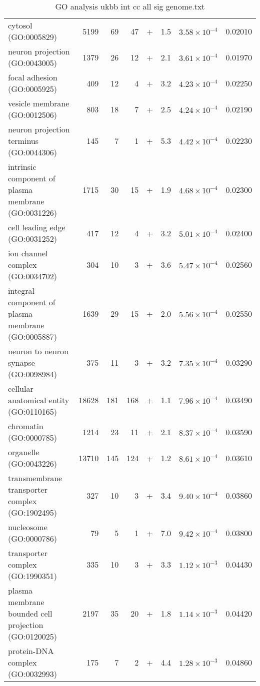\begin{table}[ht]
\begin{adjustbox}{width=\textwidth}
\begin{tabular}{lrrrlrrr}
  cytosol (GO:0005829) & 5199 & 69 & 47 & + & 1.5 & $3.58 \times 10^{-4}$ & 0.02010 \\ 
  neuron projection (GO:0043005) & 1379 & 26 & 12 & + & 2.1 & $3.61 \times 10^{-4}$ & 0.01970 \\ 
  focal adhesion (GO:0005925) & 409 & 12 & 4 & + & 3.2 & $4.23 \times 10^{-4}$ & 0.02250 \\ 
  vesicle membrane (GO:0012506) & 803 & 18 & 7 & + & 2.5 & $4.24 \times 10^{-4}$ & 0.02190 \\ 
  neuron projection terminus (GO:0044306) & 145 & 7 & 1 & + & 5.3 & $4.42 \times 10^{-4}$ & 0.02230 \\ 
  intrinsic component of plasma membrane (GO:0031226) & 1715 & 30 & 15 & + & 1.9 & $4.68 \times 10^{-4}$ & 0.02300 \\ 
  cell leading edge (GO:0031252) & 417 & 12 & 4 & + & 3.2 & $5.01 \times 10^{-4}$ & 0.02400 \\ 
  ion channel complex (GO:0034702) & 304 & 10 & 3 & + & 3.6 & $5.47 \times 10^{-4}$ & 0.02560 \\ 
  integral component of plasma membrane (GO:0005887) & 1639 & 29 & 15 & + & 2.0 & $5.56 \times 10^{-4}$ & 0.02550 \\ 
  neuron to neuron synapse (GO:0098984) & 375 & 11 & 3 & + & 3.2 & $7.35 \times 10^{-4}$ & 0.03290 \\ 
  cellular anatomical entity (GO:0110165) & 18628 & 181 & 168 & + & 1.1 & $7.96 \times 10^{-4}$ & 0.03490 \\ 
  chromatin (GO:0000785) & 1214 & 23 & 11 & + & 2.1 & $8.37 \times 10^{-4}$ & 0.03590 \\ 
  organelle (GO:0043226) & 13710 & 145 & 124 & + & 1.2 & $8.61 \times 10^{-4}$ & 0.03610 \\ 
  transmembrane transporter complex (GO:1902495) & 327 & 10 & 3 & + & 3.4 & $9.40 \times 10^{-4}$ & 0.03860 \\ 
  nucleosome (GO:0000786) & 79 & 5 & 1 & + & 7.0 & $9.42 \times 10^{-4}$ & 0.03800 \\ 
  transporter complex (GO:1990351) & 335 & 10 & 3 & + & 3.3 & $1.12 \times 10^{-3}$ & 0.04430 \\ 
  plasma membrane bounded cell projection (GO:0120025) & 2197 & 35 & 20 & + & 1.8 & $1.14 \times 10^{-3}$ & 0.04420 \\ 
  protein-DNA complex (GO:0032993) & 175 & 7 & 2 & + & 4.4 & $1.28 \times 10^{-3}$ & 0.04860 \\ 
   \hline
\end{tabular}
\end{adjustbox}
\caption{GO analysis ukbb int cc all sig genome.txt} 
\label{tab:GO analysis ukbb_int_cc_all_sig_genome.txt}
\end{table}


